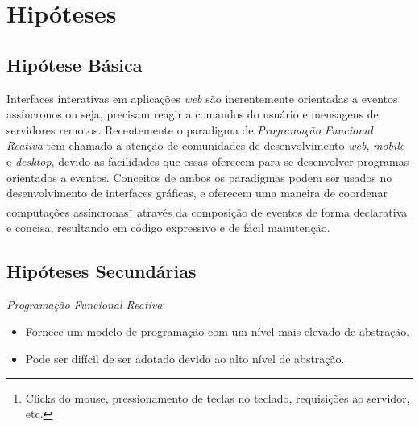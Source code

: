 \section{Hipóteses}\label{lhipoteses}


\subsection{Hipótese Básica}

Interfaces interativas em aplicações \textit{web}
são inerentemente orientadas a eventos assíncronos
ou seja, precisam reagir a comandos do usuário e
mensagens de servidores remotos.
Recentemente o paradigma de \textit{Programação Funcional Reativa}
tem chamado a atenção de
comunidades de desenvolvimento \textit{web}, \textit{mobile}
e \textit{desktop}, devido as facilidades que essas
oferecem para se desenvolver programas orientados a eventos.
Conceitos de ambos os paradigmas podem ser usados
no desenvolvimento de interfaces gráficas,
e oferecem uma maneira de coordenar
computações assíncronas\footnote{
  Clicks do mouse, pressionamento de teclas no teclado,
  requisições ao servidor, etc.
}
através da composição de eventos de forma declarativa
e concisa, resultando em código expressivo e de fácil
manutenção.


\subsection{Hipóteses Secundárias}

\textit{Programação Funcional Reativa}:
\begin{itemize}[noitemsep]
  \item Fornece um modelo de programação com um nível mais elevado
        de abstração.
  \item Pode ser difícil de ser adotado devido ao alto nível de abstração.
\end{itemize}

